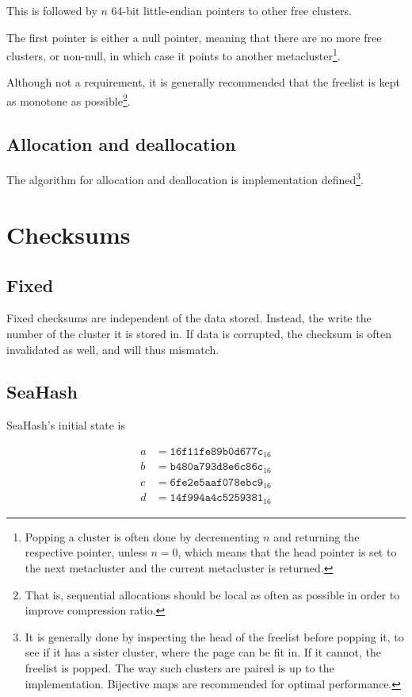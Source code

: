 \documentclass[11pt,a4paper]{report}
\begin{document}
        This is followed by $n$ 64-bit little-endian pointers to other free
        clusters.

        The first pointer is either a null pointer, meaning that there are no
        more free clusters, or non-null, in which case it points to another
        metacluster\footnote{Popping a cluster is often done by decrementing
        $n$ and returning the respective pointer, unless $n = 0$, which means
        that the head pointer is set to the next metacluster and the current
        metacluster is returned.}.

        Although not a requirement, it is generally recommended that
        the freelist is kept as monotone as possible\footnote{That is,
        sequential allocations should be local as often as possible in
        order to improve compression ratio.}.

        \subsection{Allocation and deallocation}
        The algorithm for allocation and deallocation is implementation
        defined\footnote{It is generally done by inspecting the head of the
            freelist before popping it, to see if it has a sister cluster,
            where the page can be fit in. If it cannot, the freelist is popped.
            The way such clusters are paired is up to the implementation.
            Bijective maps are recommended for optimal performance.}.

    \section{Checksums}
        \subsection{Fixed}
        \label{checksum:fixed}
        Fixed checksums are independent of the data stored. Instead, the write
        the number of the cluster it is stored in. If data is corrupted, the
        checksum is often invalidated as well, and will thus mismatch.

        \subsection{SeaHash}
        \label{checksum:seahash}
        SeaHash's initial state is

        \begin{align*}
            a &= \texttt{16f11fe89b0d677c}_{16} \\
            b &= \texttt{b480a793d8e6c86c}_{16} \\
            c &= \texttt{6fe2e5aaf078ebc9}_{16} \\
            d &= \texttt{14f994a4c5259381}_{16}
        \end{align*}
\end{document}
